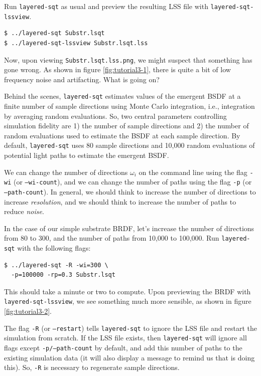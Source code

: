 \documentclass[
    twoside,
    twocolumn,
    letterpaper,
    10pt]{article}
\begin{document}
Run \texttt{layered-sqt} as usual and preview the resulting LSS 
file with \texttt{layered-sqt-lssview}.
\begin{verbatim}
$ ../layered-sqt Substr.lsqt
$ ../layered-sqt-lssview Substr.lsqt.lss
\end{verbatim}
Now, upon viewing \texttt{Substr.lsqt.lss.png}, we might suspect that 
something has gone wrong. As shown in figure \ref{fig:tutorial3-1},
there is quite a bit of low frequency noise and artifacting. What is
going on?

Behind the scenes, \texttt{layered-sqt} estimates values of the emergent 
BSDF at a finite number of sample directions using Monte Carlo integration, 
i.e., integration by averaging random evaluations. So, two central parameters 
controlling simulation fidelity are 1) the number of sample directions and 2) 
the number of random evaluations used to estimate the BSDF at each sample 
direction. By default, \texttt{layered-sqt} uses 80 sample directions and
10,000 random evaluations of potential light paths to estimate the 
emergent BSDF. 

We can change the number of directions $\omega_i$ on the command line 
using the flag \texttt{-wi} (or \texttt{--wi-count}), and we can change the
number of paths using the flag \texttt{-p} (or \texttt{--path-count}).
In general, we should think to increase the number of directions
to increase \emph{resolution}, and we should think to increase the number 
of paths to reduce \emph{noise}.

In the case of our simple substrate BRDF, let's increase the number 
of directions from 80 to 300, and the number of paths from 10,000 to 
100,000. Run \texttt{layered-sqt} with the following flags:
\begin{verbatim}
$ ../layered-sqt -R -wi=300 \
  -p=100000 -rp=0.3 Substr.lsqt
\end{verbatim}
This should take a minute or two to compute. Upon previewing the BRDF with
\texttt{layered-sqt-lssview}, we see something much more sensible, as shown
in figure \ref{fig:tutorial3-2}.

The flag \texttt{-R} (or \texttt{--restart}) tells \texttt{layered-sqt}
to ignore the LSS file and restart the simulation from scratch. 
If the LSS file exists, then \texttt{layered-sqt} will ignore all flags except 
\texttt{-p/--path-count} by default, and add this number of paths to the existing
simulation data (it will also display a message to remind us that is doing
this). So, \texttt{-R} is necessary to regenerate sample directions. 
\end{document}
